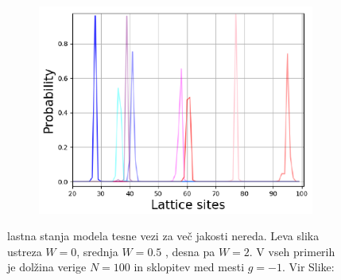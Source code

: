 \begin{figure}[H]
\begin{subfigure}{.33\textwidth}
\includegraphics[width=\linewidth]{Figures/Anderson2.pdf}
\end{subfigure}
\caption{lastna stanja modela tesne vezi za več jakosti nereda. Leva slika ustreza $W=0$, srednja $W=0.5$ , desna pa $W=2$. V vseh primerih je dolžina verige $N=100$ in sklopitev med mesti $g=-1$. Vir Slike: \cite{anderson}}
\label{fig:AndersonW}
\end{figure}

